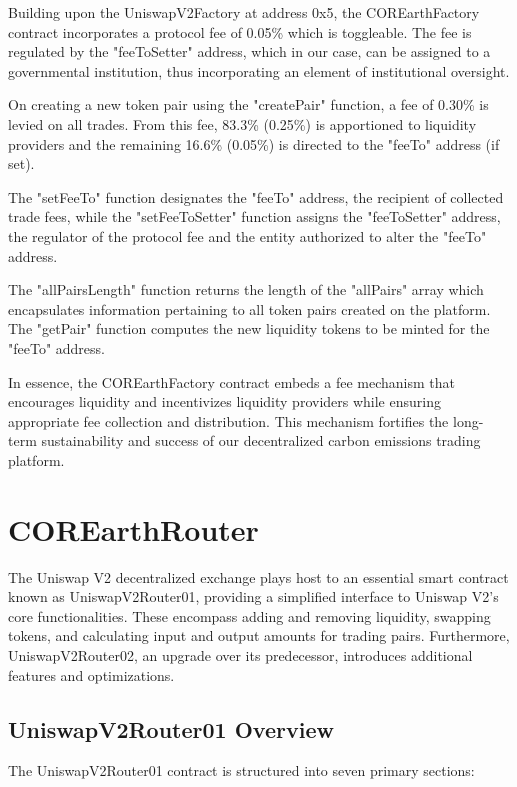 \documentclass[sigconf, authordraft]{acmart}
\begin{document}
	Building upon the UniswapV2Factory at address 0x5, the COREarthFactory
	contract incorporates a protocol fee of 0.05\% which is toggleable. The fee is
	regulated by the "feeToSetter" address, which in our case, can be assigned to
	a governmental institution, thus incorporating an element of institutional oversight.

	On creating a new token pair using the "createPair" function, a fee of 0.30\% is
	levied on all trades. From this fee, 83.3\% (0.25\%) is apportioned to liquidity
	providers and the remaining 16.6\% (0.05\%) is directed to the "feeTo" address
	(if set).

	The "setFeeTo" function designates the "feeTo" address, the recipient of
	collected trade fees, while the "setFeeToSetter" function assigns the "feeToSetter"
	address, the regulator of the protocol fee and the entity authorized to alter
	the "feeTo" address.

	The "allPairsLength" function returns the length of the "allPairs" array which
	encapsulates information pertaining to all token pairs created on the platform.
	The "getPair" function computes the new liquidity tokens to be minted for the "feeTo"
	address.

	In essence, the COREarthFactory contract embeds a fee mechanism that
	encourages liquidity and incentivizes liquidity providers while ensuring
	appropriate fee collection and distribution. This mechanism fortifies the long-term
	sustainability and success of our decentralized carbon emissions trading platform.

	\section{COREarthRouter}


	The Uniswap V2 decentralized exchange plays host to an essential smart contract
	known as UniswapV2Router01, providing a simplified interface to Uniswap V2's
	core functionalities. These encompass adding and removing liquidity, swapping
	tokens, and calculating input and output amounts for trading pairs.
	Furthermore, UniswapV2Router02, an upgrade over its predecessor, introduces additional
	features and optimizations.

	\subsection{UniswapV2Router01 Overview}


	The UniswapV2Router01 contract is structured into seven primary sections:
\end{document}
